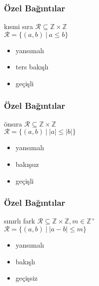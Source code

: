 \documentclass[dvipsnames]{beamer}
\theoremstyle{definition}
\theoremstyle{example}
\theoremstyle{plain}
\begin{document}
\begin{frame}
  \frametitle{Özel Bağıntılar}

  \begin{block}{kısmi sıra}
    $\mathcal{R} \subseteq \mathbb{Z} \times \mathbb{Z}$\\
    $\mathcal{R} = \{(a,b)~|~a \leq b\}$

    \medskip
    \begin{itemize}
      \item yansımalı
      \item ters bakışlı
      \item geçişli
    \end{itemize}
  \end{block}
\end{frame}

\begin{frame}
  \frametitle{Özel Bağıntılar}

  \begin{block}{önsıra}
    $\mathcal{R} \subseteq \mathbb{Z} \times \mathbb{Z}$\\
    $\mathcal{R} = \{(a,b)~|~|a| \leq |b|\}$

    \medskip
    \begin{itemize}
      \item yansımalı
      \item bakışsız
      \item geçişli
    \end{itemize}
  \end{block}
\end{frame}

\begin{frame}
  \frametitle{Özel Bağıntılar}

  \begin{block}{sınırlı fark}
    $\mathcal{R} \subseteq \mathbb{Z} \times \mathbb{Z}, m \in \mathbb{Z}^+$\\
    $\mathcal{R} = \{(a,b)~|~|a-b| \leq m\}$

    \medskip
    \begin{itemize}
      \item yansımalı
      \item bakışlı
      \item geçişsiz
    \end{itemize}
  \end{block}
\end{frame}
\end{document}
